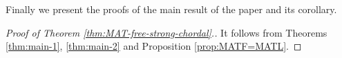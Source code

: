 Finally we present the proofs of the main result of the paper and its corollary. 

\begin{proof}[Proof of Theorem \ref{thm:MAT-free-strong-chordal}.]
It follows from Theorems \ref{thm:main-1}, \ref{thm:main-2} and Proposition \ref{prop:MATF=MATL}.
\end{proof}
